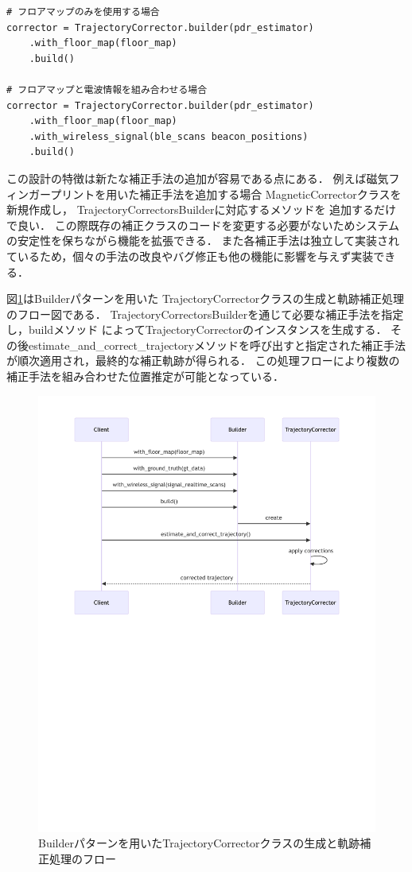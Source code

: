 \begin{lstlisting}[caption={TrajectoryCorrectorの使用例},label=lst:trajectory-corrector,float=h]
# フロアマップのみを使用する場合
corrector = TrajectoryCorrector.builder(pdr_estimator)
    .with_floor_map(floor_map)
    .build()

# フロアマップと電波情報を組み合わせる場合
corrector = TrajectoryCorrector.builder(pdr_estimator)
    .with_floor_map(floor_map)
    .with_wireless_signal(ble_scans beacon_positions)
    .build()
\end{lstlisting}

この設計の特徴は新たな補正手法の追加が容易である点にある．
例えば磁気フィンガープリントを用いた補正手法を追加する場合
MagneticCorrectorクラスを新規作成し，
TrajectoryCorrectorsBuilderに対応するメソッドを
追加するだけで良い．
この際既存の補正クラスのコードを変更する必要がないためシステムの安定性を保ちながら機能を拡張できる．
また各補正手法は独立して実装されているため，個々の手法の改良やバグ修正も他の機能に影響を与えず実装できる．

図\ref{fig:corrector-sequence}はBuilderパターンを用いた
TrajectoryCorrectorクラスの生成と軌跡補正処理のフロー図である．
TrajectoryCorrectorsBuilderを通じて必要な補正手法を指定し，buildメソッド
によってTrajectoryCorrectorのインスタンスを生成する．
その後estimate\_and\_correct\_trajectoryメソッドを呼び出すと指定された補正手法が順次適用され，最終的な補正軌跡が得られる．
この処理フローにより複数の補正手法を組み合わせた位置推定が可能となっている．

\begin{figure}[H]
    \centering
    \includegraphics[width=\linewidth]{../image/corrector-flow-diagram.pdf}
    \caption{Builderパターンを用いたTrajectoryCorrectorクラスの生成と軌跡補正処理のフロー}
    \label{fig:corrector-sequence}
\end{figure}

